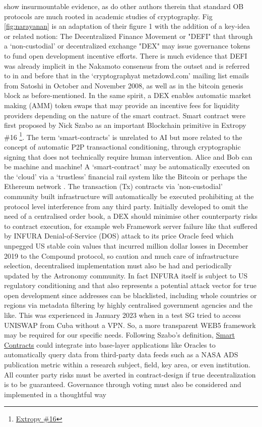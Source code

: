 \documentclass[final,5p,times,twocolumn,authoryear]{elsarticle}
\begin{document}
\cite{arvindandclark2017} show insurmountable evidence, as do other authors therein that standard OB protocols are much rooted in academic studies of cryptography. Fig \ref{fig:narayanan} is an adaptation of their figure 1 with the addition of a key-idea or related notion: The Decentralized Finance Movement or "DEFI" that through a `non-custodial' or decentralized exchange "DEX" may issue governance tokens to fund open development incentive efforts. There is much evidence that DEFI was already implicit in the Nakamoto consensus from the outset and is referred to in \cite{nak2009} and before that in the `cryptographyat metzdowd.com' mailing list emails from Satoshi in October and November 2008, as well as in the bitcoin genesis block as before-mentioned. In the same spirit, a DEX enables automatic market making (AMM) token swaps that may provide an incentive fees for liquidity providers depending on the nature of the smart contract. Smart contract were first proposed by Nick Szabo as an important Blockchain primitive in Extropy \#16 \footnote{\href{ https://archive.org/details/extropy-16}{Extropy \#16}}. The term `smart-contracts' is unrelated to AI but more related to the concept of automatic P2P transactional conditioning, through cryptographic signing that does not technically require human intervention. Alice and Bob can be machine and machine!  A `smart-contract' may be automatically executed on the `cloud' via a `trustless' financial rail system like the Bitcoin or perhaps the Ethereum network \citep{antono_me19}. The transaction (Tx) contracts via 'non-custodial' community built infrastructure will automatically be executed prohibiting at the protocol level interference from any third party. Initially developed to omit the need of a centralised order book, a DEX should minimise other counterparty risks to contract execution, for example web Framework server failure like that suffered by INFURA Denial-of-Service (DOS) attack to its price Oracle feed which unpegged US stable coin values that incurred million dollar losses in December 2019 to the Compound protocol, so caution and much care of infrastructure selection, decentralised implementation must also be had and periodically updated by the Astronomy community. In fact INFURA itself is subject to US regulatory conditioning and that also represents a potential attack vector for true open development since addresses can be blacklisted, including whole countries or regions via metadata filtering by highly centralised government agencies and the like. This was experienced in January 2023 when in a test SG tried to access UNISWAP from Cuba without a VPN. So, a more transparent WEB5 framework may be required for our specific needs. Following Szabo's definition, \href{https://www.fon.hum.uva.nl/rob/Courses/InformationInSpeech/CDROM/Literature/LOTwinterschool2006/szabo.best.vwh.net/smart.contracts.html}{Smart Contracts} could integrate into base-layer applications like Oracles to automatically query data from third-party data feeds such as a NASA ADS publication metric within a research subject, field, key area,  or even institution. All counter party risks must be averted in contract-design if true decentralization is to be guaranteed. Governance through voting must also be considered and implemented in a thoughtful way 
\end{document}
